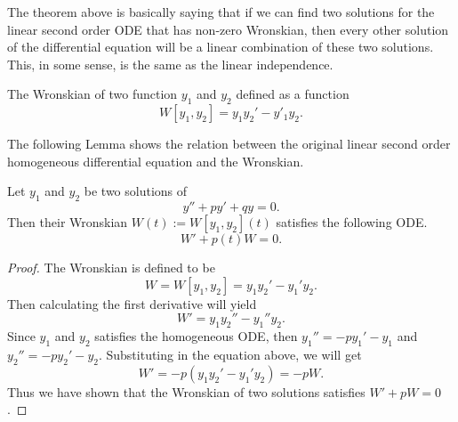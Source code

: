The theorem above is basically saying that if we can find two solutions for the linear second order ODE that has non-zero Wronskian, then every other solution of the differential equation will be a linear combination of these two solutions. This, in some sense, is the same as the linear independence.

\begin{definition}
	The Wronskian of two function $ y_1 $ and $ y_2 $ defined as a function 
	\[ W[y_1,y_2] = y_1y_2' - y'_1y_2. \]
\end{definition}

The following Lemma shows the relation between the original linear second order homogeneous differential equation and the Wronskian.

\begin{lemma}
	Let $ y_1 $ and $ y_2 $ be two solutions of 
	\[ y'' + py' + qy = 0. \]
	Then their Wronskian $ W(t) := W[y_1,y_2](t) $ satisfies the following ODE.
	\[ W' + p(t)W = 0. \]
\end{lemma}
\begin{proof}
	The Wronskian is defined to be
	\[ W = W[y_1,y_2]= y_1y_2' - y_1'y_2. \]
	Then calculating the first derivative will yield
	\[ W' = y_1y_2'' - y_1''y_2. \]
	Since $ y_1 $ and $ y_2 $ satisfies the homogeneous ODE, then $ y_1'' = -py_1' - y_1 $ and $ y_2'' = -py_2' - y_2 $. Substituting in the equation above, we will get
	\[ W' = -p(y_1y_2' - y_1'y_2) = -pW.  \]
	Thus we have shown that the Wronskian of two solutions satisfies $ W' + pW = 0 $.
\end{proof}

